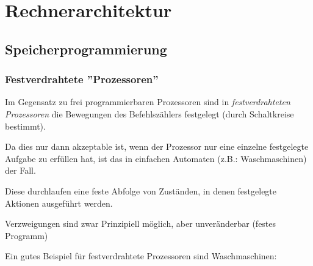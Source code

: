 \documentclass[12pt]{report}
\begin{document}
\chapter{Rechnerarchitektur}

\section{Speicherprogrammierung}
\subsection{Festverdrahtete ''Prozessoren''}
\begin{defbox}
  Im Gegensatz zu frei programmierbaren Prozessoren sind in \textit{festverdrahteten Prozessoren} die Bewegungen
  des Befehlszählers festgelegt (durch Schaltkreise bestimmt).
  
  Da dies nur dann akzeptable ist, wenn der Prozessor nur eine einzelne festgelegte Aufgabe zu erfüllen hat, ist das 
  in einfachen Automaten (z.B.: Waschmaschinen) der Fall.
  
  Diese durchlaufen eine feste Abfolge von Zuständen, in denen festgelegte Aktionen ausgeführt werden.
  
  Verzweigungen sind zwar Prinzipiell möglich, aber unveränderbar (festes Programm)
\end{defbox}
Ein gutes Beispiel für festverdrahtete Prozessoren sind Waschmaschinen:
\end{document}
